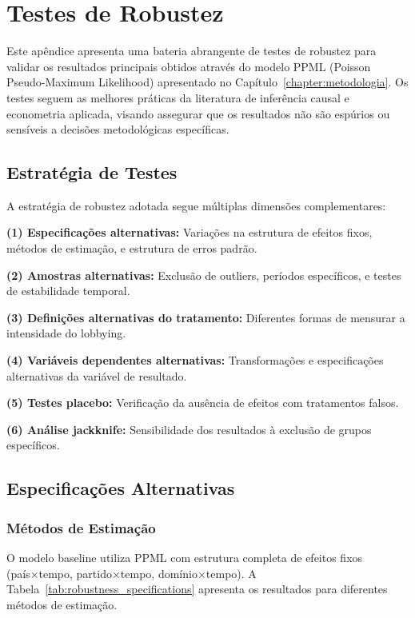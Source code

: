\appendix

\chapter{Testes de Robustez}
\label{appendix:robustness}

Este apêndice apresenta uma bateria abrangente de testes de robustez para validar os resultados principais obtidos através do modelo PPML (Poisson Pseudo-Maximum Likelihood) apresentado no Capítulo~\ref{chapter:metodologia}. Os testes seguem as melhores práticas da literatura de inferência causal e econometria aplicada, visando assegurar que os resultados não são espúrios ou sensíveis a decisões metodológicas específicas.

\section{Estratégia de Testes}

A estratégia de robustez adotada segue múltiplas dimensões complementares:

\textbf{(1) Especificações alternativas:} Variações na estrutura de efeitos fixos, métodos de estimação, e estrutura de erros padrão.

\textbf{(2) Amostras alternativas:} Exclusão de outliers, períodos específicos, e testes de estabilidade temporal.

\textbf{(3) Definições alternativas do tratamento:} Diferentes formas de mensurar a intensidade do lobbying.

\textbf{(4) Variáveis dependentes alternativas:} Transformações e especificações alternativas da variável de resultado.

\textbf{(5) Testes placebo:} Verificação da ausência de efeitos com tratamentos falsos.

\textbf{(6) Análise jackknife:} Sensibilidade dos resultados à exclusão de grupos específicos.

\section{Especificações Alternativas}

\subsection{Métodos de Estimação}

O modelo baseline utiliza PPML com estrutura completa de efeitos fixos (país×tempo, partido×tempo, domínio×tempo). A Tabela~\ref{tab:robustness_specifications} apresenta os resultados para diferentes métodos de estimação.


